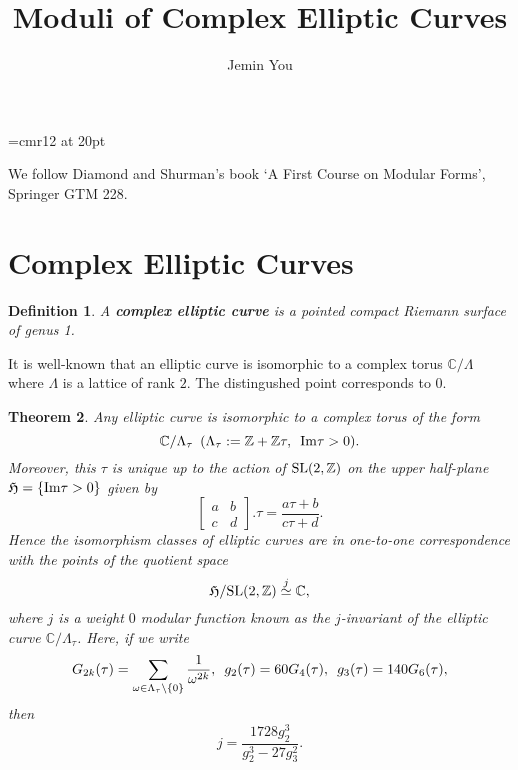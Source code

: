 \documentclass[a4paper,11pt]{article}
\begin{document}
\theoremstyle{plain}
\newtheorem{thm}{Theorem}[section]
\newtheorem{defn}[thm]{Definition}
\newtheorem{exm}[thm]{Example}
\newtheorem{prp}[thm]{Proposition}
\newtheorem{rem}[thm]{Remark}
\newtheorem{lem}[thm]{Lemma}

\font\myfont=cmr12 at 20pt

\title{\vspace{-5ex} \myfont Moduli of Complex Elliptic Curves}
\author{Jemin You}
\date{\vspace{-5ex}}
\maketitle

\setcounter{section}{0}

We follow Diamond and Shurman's book `A First Course on Modular Forms', Springer GTM 228.

\section{Complex Elliptic Curves}

\begin{defn}
A \textbf{complex elliptic curve} is a pointed compact Riemann surface of genus 1.
\end{defn}

It is well-known that an elliptic curve is isomorphic to a complex torus $\mathbb{C}/\Lambda$ where $\Lambda$ is a lattice of rank $2$.
The distingushed point corresponds to $0$.

\begin{thm}
Any  elliptic curve is isomorphic to a complex torus of the form
\[
\mathbb{C}/\Lambda_{\tau} \enskip (\Lambda_{\tau}:=\mathbb{Z}+\mathbb{Z}\tau, \enskip \textnormal{Im}\tau > 0).
\]
Moreover, this $\tau$ is unique up to the action of $\textnormal{SL}(2,\mathbb{Z})$ on the upper half-plane $\mathfrak{H}=\{\textnormal{Im}\tau>0\}$ given by
\[
\begin{bmatrix} a & b \\ c & d \end{bmatrix}.\tau = \frac{a\tau+b}{c\tau+d}.
\]
Hence the isomorphism classes of elliptic curves are in one-to-one correspondence with the points of the quotient space
\[
\mathfrak{H}/\textnormal{SL}(2,\mathbb{Z}) \stackrel{j}{\simeq} \mathbb{C},
\]
where $j$ is a weight $0$ modular function known as the $j$-invariant of the elliptic curve $\mathbb{C}/\Lambda_{\tau}$.
Here, if we write
\[
G_{2k}(\tau)=\sum_{\omega \in \Lambda_{\tau} \setminus \{0\}}\frac{1}{\omega^{2k}}, \enskip
g_2(\tau)=60G_4(\tau), \enskip g_3(\tau)=140G_6(\tau),
\]
then
\[
j=\frac{1728g_2^3}{g_2^3-27g_3^2}.
\]
\end{thm}
\end{document}
